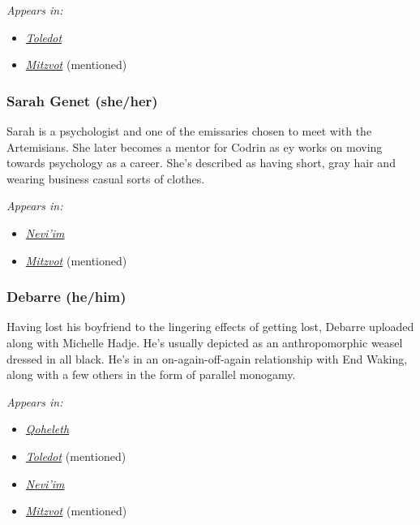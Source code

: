 \emph{Appears in:}

\begin{itemize}
\tightlist
\item
  \href{https://toledot.post-self.ink}{\emph{Toledot}}
\item
  \href{https://mitzvot.post-self.ink}{\emph{Mitzvot}} (mentioned)
\end{itemize}

\subsubsection{Sarah Genet (she/her)}

Sarah is a psychologist and one of the emissaries chosen to meet with the Artemisians. She later becomes a mentor for Codrin as ey works on moving towards psychology as a career. She's described as having short, gray hair and wearing business casual sorts of clothes.

\emph{Appears in:}

\begin{itemize}
\tightlist
\item
  \href{https://neviim.post-self.ink}{\emph{Nevi'im}}
\item
  \href{https://mitzvot.post-self.ink}{\emph{Mitzvot}} (mentioned)
\end{itemize}

\subsubsection{Debarre (he/him)}

Having lost his boyfriend to the lingering effects of getting lost, Debarre uploaded along with Michelle Hadje. He's usually depicted as an anthropomorphic weasel dressed in all black. He's in an on-again-off-again relationship with End Waking, along with a few others in the form of parallel monogamy.

\emph{Appears in:}

\begin{itemize}
\tightlist
\item
  \href{https://qoheleth.post-self.ink}{\emph{Qoheleth}}
\item
  \href{https://toledot.post-self.ink}{\emph{Toledot}} (mentioned)
\item
  \href{https://neviim.post-self.ink}{\emph{Nevi'im}}
\item
  \href{https://mitzvot.post-self.ink}{\emph{Mitzvot}} (mentioned)
\end{itemize}

